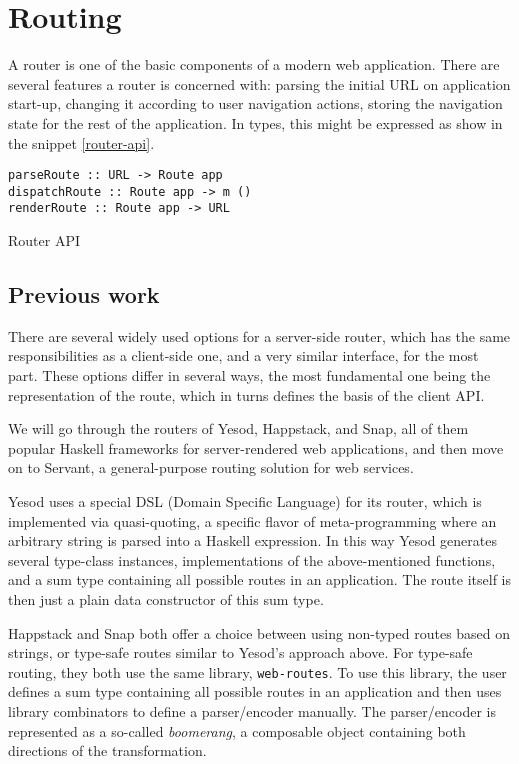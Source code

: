 \documentclass[english,odsaz]{fitthesis}
\begin{document}
\section{Routing}
\label{sec:org3ea8e8d}
A router is one of the basic components of a modern web application. There are
several features a router is concerned with: parsing the initial URL on
application start-up, changing it according to user navigation actions, storing
the navigation state for the rest of the application. In types, this might be
expressed as show in the snippet \ref{router-api}.

\begin{listing}[htbp]
\begin{verbatim}
parseRoute :: URL -> Route app
dispatchRoute :: Route app -> m ()
renderRoute :: Route app -> URL
\end{verbatim}
\caption{Router API \label{router-api}}
\end{listing}

\subsection{Previous work}
\label{sec:org6af6f59}
There are several widely used options for a server-side router, which has the
same responsibilities as a client-side one, and a very similar interface, for
the most part. These options differ in several ways, the most fundamental one
being the representation of the route, which in turns defines the basis of the
client API.

We will go through the routers of Yesod, Happstack, and Snap, all of them
popular Haskell frameworks for server-rendered web applications, and then move
on to Servant, a general-purpose routing solution for web services.

Yesod uses a special DSL (Domain Specific Language) for its router, which is
implemented via quasi-quoting, a specific flavor of meta-programming where an
arbitrary string is parsed into a Haskell expression. In this way Yesod
generates several type-class instances, implementations of the above-mentioned
functions, and a sum type containing all possible routes in an application. The
route itself is then just a plain data constructor of this sum type.

Happstack and Snap both offer a choice between using non-typed routes based on
strings, or type-safe routes similar to Yesod's approach above. For type-safe
routing, they both use the same library, \texttt{web-routes}. To use this library, the
user defines a sum type containing all possible routes in an application and
then uses library combinators to define a parser/encoder manually. The
parser/encoder is represented as a so-called \emph{boomerang}, a composable object
containing both directions of the transformation.
\end{document}

